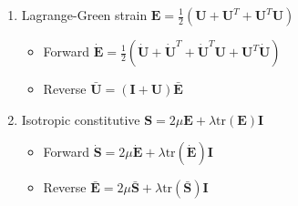 \documentclass{article}
\begin{document}
\begin{enumerate}
\item Lagrange-Green strain $\mathbf{E} = \frac{1}{2} \left( \mathbf{U} + \mathbf{U}^{T} + \mathbf{U}^{T} \mathbf{U} \right)$
\begin{itemize}
\item Forward $\dot{\mathbf{E}} = \frac{1}{2} \left( \dot{\mathbf{U}} + \dot{\mathbf{U}}^{T} + \dot{\mathbf{U}}^{T} \mathbf{U} + \mathbf{U}^{T} \dot{\mathbf{U}} \right)$
\item Reverse $\bar{\mathbf{U}} = (\mathbf{I} + \mathbf{U}) \bar{\mathbf{E}}$
\end{itemize}

\item Isotropic constitutive $\mathbf{S} = 2 \mu \mathbf{E} + \lambda \text{tr}(\mathbf{E}) \mathbf{I}$
\begin{itemize}
\item Forward $\dot{\mathbf{S}} = 2 \mu \dot{\mathbf{E}} + \lambda \text{tr}(\dot{\mathbf{E}}) \mathbf{I}$
\item Reverse $\bar{\mathbf{E}} = 2 \mu \bar{\mathbf{S}} + \lambda \text{tr}(\bar{\mathbf{S}}) \mathbf{I}$
\end{itemize}

\end{enumerate}
\end{document}
